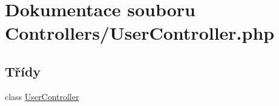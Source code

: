 \hypertarget{_user_controller_8php}{\section{Dokumentace souboru Controllers/\-User\-Controller.php}
\label{_user_controller_8php}
}
\subsection*{Třídy}
\begin{DoxyCompactItemize}
\item 
class \hyperlink{class_user_controller}{User\-Controller}
\end{DoxyCompactItemize}
